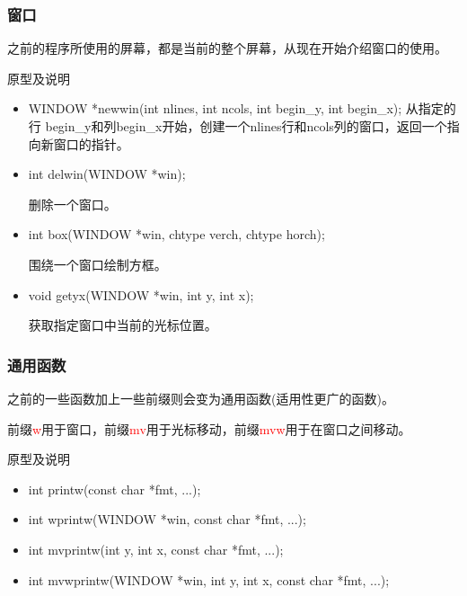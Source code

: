 \documentclass{beamer}
\begin{document}
\begin{frame}
\frametitle{窗口}
之前的程序所使用的屏幕，都是当前的整个屏幕，从现在开始介绍窗口的使用。
\begin{block}{原型及说明}
\begin{itemize}
\item
WINDOW *newwin(int nlines, int ncols, int begin\_y,
             int begin\_x);
从指定的行 begin\_y和列begin\_x开始，创建一个nlines行和ncols列的窗口，返回一个指向新窗口的指针。          
\item
int delwin(WINDOW *win);

删除一个窗口。
\item
int box(WINDOW *win, chtype verch, chtype horch);

围绕一个窗口绘制方框。
\item
void getyx(WINDOW *win, int y, int x);

获取指定窗口中当前的光标位置。
\end{itemize}
\end{block}

\end{frame}


\begin{frame}
\frametitle{通用函数}
之前的一些函数加上一些前缀则会变为通用函数(适用性更广的函数)。

前缀\textcolor{red}{w}用于窗口，前缀\textcolor{red}{mv}用于光标移动，前缀\textcolor{red}{mvw}用于在窗口之间移动。


\begin{block}{原型及说明}
\begin{itemize}
\item
int printw(const char *fmt, ...);
\item
int wprintw(WINDOW *win, const char *fmt, ...);
\item
int mvprintw(int y, int x, const char *fmt, ...);
\item
int mvwprintw(WINDOW *win, int y, int x, const char *fmt, ...);
\end{itemize}
\end{block}

\end{frame}

\end{document}
